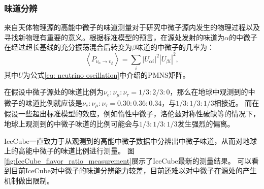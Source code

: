 \subsubsection{味道分辨}

来自天体物理源的高能中微子的味道测量对于研究中微子源内发生的物理过程以及寻找新物理有重要的意义\cite{Arguelles_flavor:2015, snowmass_flavor:2022}。根据标准模型的预言，在源处发射的味道为$\alpha$的中微子在经过超长基线的充分振荡混合后转变为$\beta$味道的中微子的几率为\cite{Farzan_coherence_oscillation:2008}：
\begin{equation}
    \left\langle P_{\nu_\alpha \rightarrow v_\beta}\right\rangle=\sum_i\left|U_{\alpha i}\right|^2\left|U_{\beta i}\right|^2, 
    \label{eq:flavor_transform}
\end{equation}
其中$U$为公式\ref{eq: neutrino oscillation}中介绍的PMNS矩阵。

在假设中微子源处的味道比例为$\nu_e: \nu_\mu: \nu_\tau=1 / 3: 2 / 3: 0$，那么在地球中观测到的中微子的味道比例就应该是$\nu_e: \nu_\mu: \nu_\tau = 0.30 : 0.36 : 0.34$，与$1/3 : 1/3 : 1/3$相接近。
而在假设一些超出标准模型的效应，例如惰性中微子\cite{IceCube_sterile:2016, Arguelles_flavor_sterile:2019}，洛伦兹对称性破缺\cite{IceCube_flavor_Lorentz:2017}等的情况下，地球上观测到的中微子味道的比例可能会与$1/3 : 1/3 : 1/3$发生强烈的偏离。

IceCube一直致力于从观测到的高能中微子数据中分辨出中微子味道，从而对地球上的高能中微子的味道比例进行测量\cite{IceCube_flux_flavor:2015, IceCube_inelestic_flavor:2018, IceCube_tau:2020}。
图\ref{fig:IceCube_flavor_ratio_measurement}展示了IceCube最新的测量结果。
可以看到目前IceCube对中微子的味道分辨能力较差，目前还难以对中微子在源处的产生机制做出限制。

